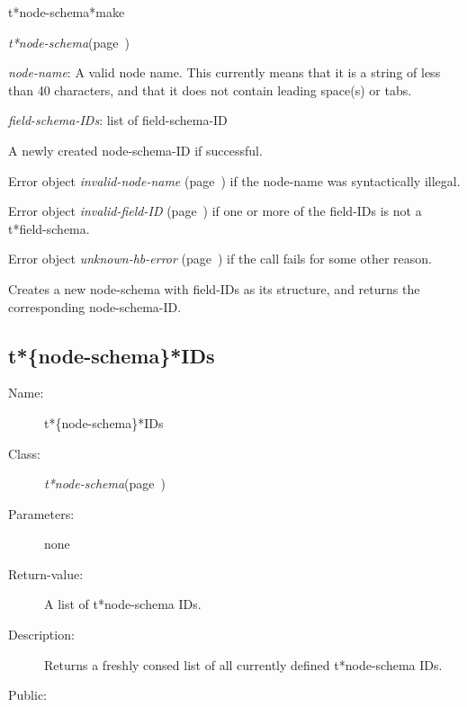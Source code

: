 \begin{description}
\item [Name:]  t*node-schema*make

\item [Class:] {\sl t*node-schema}\hfill(page~\pageref{t*node-schema})

\item [Parameters:]
\item {\sl node-name}:  
A valid node name. This currently means that it is a
string of less than 40 characters, and that it does
not contain leading space(s) or tabs.

\item {\sl field-schema-IDs}:  list of field-schema-ID


\item [Return-value:] 
A newly created node-schema-ID if successful.

Error object {\sl invalid-node-name} (page~\pageref{invalid-node-name}) if the node-name
was syntactically illegal.

Error object {\sl invalid-field-ID} (page~\pageref{invalid-field-ID}) if one or more of the
field-IDs is not a t*field-schema.

Error object {\sl unknown-hb-error} (page~\pageref{unknown-hb-error}) if the call fails
for some other reason.
 
\item [Description:]

Creates a new node-schema with field-IDs as its
structure, and returns the corresponding node-schema-ID.

\item [Public:]



\end{description}
\horizontalline

\subsection{t*\{node-schema\}*IDs}
\label{t*node-schema*IDs}

\begin{description}
\item [Name:]  t*\{node-schema\}*IDs

\item [Class:]
{\sl t*node-schema}\hfill(page~\pageref{t*node-schema})

\item [Parameters:] none

\item [Return-value:]

A list of t*node-schema IDs.

\item [Description:]

Returns a freshly consed list of all currently
defined t*node-schema IDs. 

\item [Public:]



\end{description}
\horizontalline

